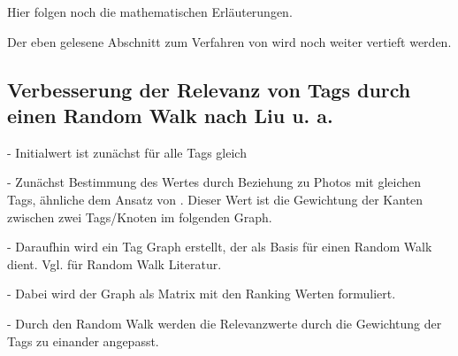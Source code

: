 Hier folgen noch die mathematischen Erläuterungen.

Der eben gelesene Abschnitt zum Verfahren von \cite{collectiveKnowledge} wird noch weiter vertieft werden.


\subsection{Verbesserung der Relevanz von Tags durch einen Random Walk nach Liu u. a.} %
\label{sub:verbesserung_der_relevanz_durch_einen_random_walk}

%     

- Initialwert ist zunächst für alle Tags gleich

- Zunächst Bestimmung des Wertes durch Beziehung zu Photos mit gleichen Tags, ähnliche dem Ansatz von \cite{collectiveKnowledge}. Dieser Wert ist die Gewichtung der Kanten zwischen zwei Tags/Knoten im folgenden Graph.

- Daraufhin wird ein Tag Graph erstellt, der als Basis für einen Random Walk dient. Vgl. \cite{} für Random Walk Literatur. 

- Dabei wird der Graph als Matrix mit den Ranking Werten formuliert. 

- Durch den Random Walk werden die Relevanzwerte durch die Gewichtung der Tags zu einander angepasst.




